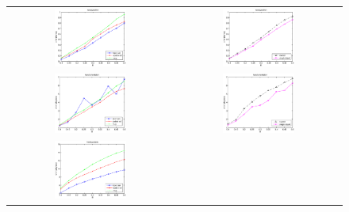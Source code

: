 \begin{figure}[htbp]
  \begin{center}
    \begin{tabular}{cc}
      \includegraphics[width=0.45\textwidth]{error_pos.eps} &
      \includegraphics[width=0.45\textwidth]{error_cmp_pos.eps} \\
      \includegraphics[width=0.45\textwidth]{error_ori.eps} &
      \includegraphics[width=0.45\textwidth]{error_cmp_ori.eps} \\
      \includegraphics[width=0.45\textwidth]{error_pst.eps} &

\end{tabular}
\end{center}
\end{figure}

